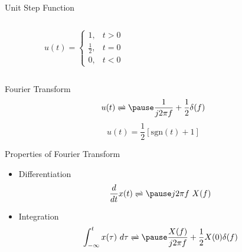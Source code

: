 \documentclass[t]{beamer}
\begin{document}
\begin{frame}{Unit Step Function}
  \begin{columns}
    \begin{column}{0.5\textwidth}
      \begin{equation*}
          u(t) = \left\{
                  \begin{array}{rr}
                  1, & t > 0 \\
                  \frac{1}{2}, & t = 0 \\
                  0, & t < 0 
                  \end{array}
                \right.
      \end{equation*}
    \end{column}

    \begin{column}{0.5\textwidth}
      \begin{figure}
        \centering
      \end{figure}
    \end{column}
  \end{columns}
  \pause
  Fourier Transform
  \begin{equation*}
    u(t) \xrightleftharpoons{} \pause \frac{1}{j2\pi f} + \frac{1}{2}\delta(f)
  \end{equation*}
  \pause
  \begin{equation*}
    u(t) = \frac{1}{2}[\text{sgn}(t) + 1]
  \end{equation*}
\end{frame}

\begin{frame}{Properties of Fourier Transform}
  \begin{itemize}
    \item Differentiation
      \begin{equation*}
        \frac{d}{dt} x(t) \xrightleftharpoons{} \pause j2\pi f\  X(f)
      \end{equation*}
    \pause
    \item Integration
      \begin{equation*}
        \int_{-\infty}^{t} x(\tau) \ d\tau \xrightleftharpoons{} \pause \frac{X(f)}{j2\pi f} + \frac{1}{2} X(0)\delta(f)
      \end{equation*}
  \end{itemize}
\end{frame}
\end{document}
